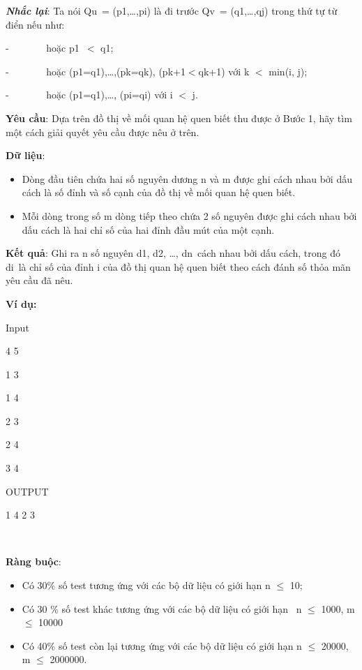 \textbf{\emph{Nhắc lại}}: Ta nói Qu = (p1,…,pi) là đi trước Qv = (q1,…,qj) trong thứ tự từ điển nếu như:

-        hoặc p1 $<$ q1;

-        hoặc (p1=q1),…,(pk=qk), (pk+1$<$qk+1) với k $<$ min(i, j);

-        hoặc (p1=q1),…, (pi=qi) với i $<$ j.

\textbf{Yêu cầu}: Dựa trên đồ thị về mối quan hệ quen biết thu được ở Bước 1, hãy tìm một cách giải quyết yêu cầu được nêu ở trên.

\textbf{Dữ liệu}:
\begin{itemize}
	\item Dòng đầu tiên chứa hai số nguyên dương n và m được ghi cách nhau bởi dấu cách là số đỉnh và số cạnh của đồ thị về mối quan hệ quen biết.
	\item Mỗi dòng trong số m dòng tiếp theo chứa 2 số nguyên được ghi cách nhau bởi dấu cách là hai chỉ số của hai đỉnh đầu mút của một cạnh.
\end{itemize}

\textbf{Kết quả}: Ghi ra n số nguyên d1, d2, …, dn cách nhau bởi dấu cách, trong đó di là chỉ số của đỉnh i của đồ thị quan hệ quen biết theo cách đánh số thỏa mãn yêu cầu đã nêu.

\textbf{Ví dụ:}

Input

4 5

1 3

1 4

2 3

2 4

3 4

OUTPUT

1 4 2 3

 

\textbf{Ràng buộc}:
\begin{itemize}
	\item Có 30\% số test tương ứng với các bộ dữ liệu có giới hạn n  $\le$  10;
	\item Có 30 \% số test khác tương ứng với các bộ dữ liệu có giới hạn  n  $\le$  1000, m  $\le$  10000
	\item Có 40\% số test còn lại tương ứng với các bộ dữ liệu có giới hạn n  $\le$  20000, m  $\le$  2000000.
\end{itemize}

 
